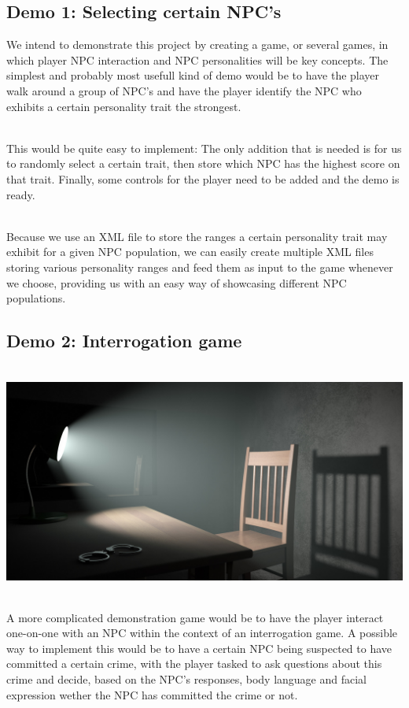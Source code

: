 \documentclass[11pt]{article} %
\begin{document}
\subsection{Demo 1: Selecting certain NPC's}
We intend to demonstrate this project by creating a game, or several games, in which player NPC interaction and NPC personalities will be key concepts. The simplest and probably most usefull kind of demo would be to have the player walk around a group of NPC's and have the player identify the NPC who exhibits a certain personality trait the strongest. 

~\\
This would be quite easy to implement: The only addition that is needed is for us to randomly select a certain trait, then store which NPC has the highest score on that trait. Finally, some controls for the player need to be added and the demo is ready. 

~\\
Because we use an XML file to store the ranges a certain personality trait may exhibit for a given NPC population, we can easily create multiple XML files storing various personality ranges and feed them as input to the game whenever we choose, providing us with an easy way of showcasing different NPC populations.

\newpage
\subsection{Demo 2: Interrogation game}

~\\
\includegraphics[scale=0.7]{Interrogation}

~\\
A more complicated demonstration game would be to have the player interact one-on-one with an NPC within the context of an interrogation game. A possible way to implement this would be to have a certain NPC being suspected to have committed a certain crime, with the player tasked to ask questions about this crime and decide, based on the NPC's responses, body language and facial expression wether the NPC has committed the crime or not. 
\end{document}
